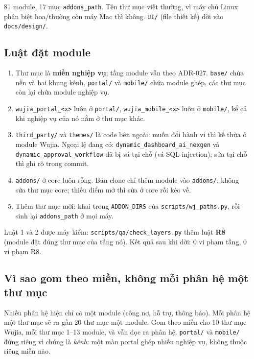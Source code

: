 81 module, 17 mục \texttt{addons\_path}. Tên thư mục viết thường, vì máy chủ Linux phân biệt hoa/thường còn máy Mac
thì không. \texttt{UI/} (file thiết kế) dời vào \texttt{docs/design/}.

\subsection{Luật đặt module}

\begin{enumerate}[nosep]
\item Thư mục là \textbf{miền nghiệp vụ}; tầng module vẫn theo ADR-027. \texttt{base/} chứa nền và hai khung kênh,
  \texttt{portal/} và \texttt{mobile/} chứa module ghép, các thư mục còn lại chứa module nghiệp vụ.
\item \texttt{wujia\_portal\_<x>} luôn ở \texttt{portal/}, \texttt{wujia\_mobile\_<x>} luôn ở \texttt{mobile/}, kể cả
  khi nghiệp vụ của nó nằm ở thư mục khác.
\item \texttt{third\_party/} và \texttt{themes/} là code bên ngoài: muốn đổi hành vi thì kế thừa ở module Wujia.
  Ngoại lệ đang có: \texttt{dynamic\_dashboard\_ai\_nexgen} và \texttt{dynamic\_approval\_workflow} đã bị vá tại
  chỗ (vá SQL injection); sửa tại chỗ thì ghi rõ trong commit.
\item \texttt{addons/} ở core luôn rỗng. Bản clone chỉ thêm module vào \texttt{addons/}, không sửa thư mục core;
  thiếu điểm mở thì sửa ở core rồi kéo về.
\item Thêm thư mục mới: khai trong \texttt{ADDON\_DIRS} của \texttt{scripts/wj\_paths.py}, rồi sinh lại
  \texttt{addons\_path} ở mọi máy.
\end{enumerate}

Luật 1 và 2 được máy kiểm: \texttt{scripts/qa/check\_layers.py} thêm luật \textbf{R8} (module đặt đúng thư mục của
tầng nó). Kết quả sau khi dời: 0 vi phạm tầng, 0 vi phạm R8.

\subsection{Vì sao gom theo miền, không mỗi phân hệ một thư mục}

Nhiều phân hệ hiện chỉ có một module (công nợ, hỗ trợ, thông báo). Mỗi phân hệ một thư mục sẽ ra gần 20 thư mục một
module. Gom theo miền cho 10 thư mục Wujia, mỗi thư mục 1--13 module, và vẫn đọc ra phân hệ. \texttt{portal/} và
\texttt{mobile/} đứng riêng vì chúng là \emph{kênh}: một màn portal ghép nhiều nghiệp vụ, không thuộc riêng miền nào.

